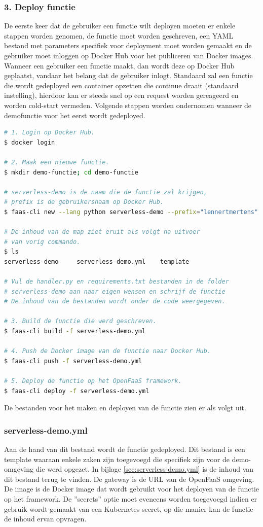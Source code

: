 \subsubsection{3. Deploy functie}
De eerste keer dat de gebruiker een functie wilt deployen moeten er enkele stappen worden genomen, de functie moet worden geschreven, een YAML bestand met parameters specifiek voor deployment moet worden gemaakt en de gebruiker moet inloggen op Docker Hub voor het publiceren van Docker images. Wanneer een gebruiker een functie maakt, dan wordt deze op Docker Hub geplaatst, vandaar het belang dat de gebruiker inlogt. Standaard zal een functie die wordt gedeployed een container opzetten die continue draait (standaard instelling), hierdoor kan er steeds snel op een request worden gereageerd en worden cold-start vermeden. Volgende stappen worden ondernomen wanneer de demofunctie voor het eerst wordt gedeployed.

\begin{lstlisting}[language=bash]
# 1. Login op Docker Hub.
$ docker login

# 2. Maak een nieuwe functie.
$ mkdir demo-functie; cd demo-functie

# serverless-demo is de naam die de functie zal krijgen,
# prefix is de gebruikersnaam op Docker Hub.
$ faas-cli new --lang python serverless-demo --prefix="lennertmertens"

# De inhoud van de map ziet eruit als volgt na uitvoer 
# van vorig commando.
$ ls
serverless-demo     serverless-demo.yml    template

# Vul de handler.py en requirements.txt bestanden in de folder 
# serverless-demo aan naar eigen wensen en schrijf de functie
# De inhoud van de bestanden wordt onder de code weergegeven.

# 3. Build de functie die werd geschreven.
$ faas-cli build -f serverless-demo.yml

# 4. Push de Docker image van de functie naar Docker Hub.
$ faas-cli push -f serverless-demo.yml

# 5. Deploy de functie op het OpenFaaS framework.
$ faas-cli deploy -f serverless-demo.yml
\end{lstlisting}

De bestanden voor het maken en deployen van de functie zien er als volgt uit.
\subsubsection{serverless-demo.yml}
Aan de hand van dit bestand wordt de functie gedeployed. Dit bestand is een template waaraan enkele zaken zijn toegevoegd die specifiek zijn voor de demo-omgeving die werd opgezet. In bijlage \ref{sec:serverless-demo.yml} is de inhoud van dit bestand terug te vinden. De gateway is de URL van de OpenFaaS omgeving. De image is de Docker image dat wordt gebruikt voor het deployen van de functie op het framework. De ''secrets'' optie moet eveneens worden toegevoegd indien er gebruik wordt gemaakt van een Kubernetes secret, op die manier kan de functie de inhoud ervan opvragen.

